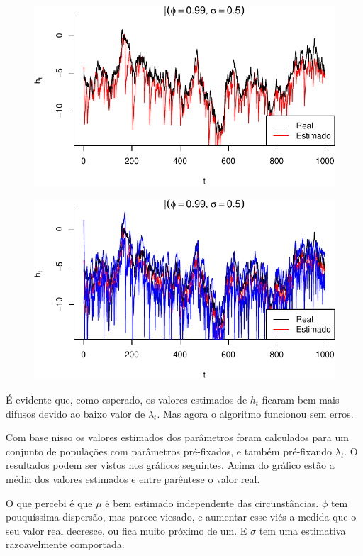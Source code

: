 \documentclass[12pt, a4paper]{article}
\begin{document}
\begin{figure}[ht]
  \centering
  \includegraphics{img/p099s05_4}
\end{figure}

\begin{figure}[ht]
  \centering
  \includegraphics{img/p099s05_5}
\end{figure}

\newpage
É evidente que, como esperado, os valores estimados de $h_t$ ficaram bem mais difusos devido ao baixo valor de $\lambda_t$. Mas agora o algoritmo funcionou sem erros.

Com base nisso os valores estimados dos parâmetros foram calculados para um conjunto de populações com parâmetros pré-fixados, e também pré-fixando $\lambda_t$. O resultados podem ser vistos nos gráficos seguintes. Acima do gráfico estão a média dos valores estimados e entre parêntese o valor real.

O que percebi é que $\mu$ é bem estimado independente das circunstâncias. $\phi$ tem pouquíssima dispersão, mas parece viesado, e aumentar esse viés a medida que o seu valor real decresce, ou fica muito próximo de um. E $\sigma$ tem uma estimativa razoavelmente comportada.
\end{document}

